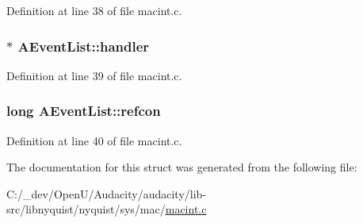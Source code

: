 Definition at line 38 of file macint.\+c.

\subsubsection[{\texorpdfstring{handler}{handler}}]{$\ast$ A\+Event\+List\+::handler}\hypertarget{struct_a_event_list_a227d5e9032200367a7a54898a0ea0eed}{}\label{struct_a_event_list_a227d5e9032200367a7a54898a0ea0eed}


Definition at line 39 of file macint.\+c.

\subsubsection[{\texorpdfstring{refcon}{refcon}}]{\setlength{\rightskip}{0pt plus 5cm}long A\+Event\+List\+::refcon}\hypertarget{struct_a_event_list_ab0bffe731a66d56658a41f5e2fdbfbff}{}\label{struct_a_event_list_ab0bffe731a66d56658a41f5e2fdbfbff}


Definition at line 40 of file macint.\+c.



The documentation for this struct was generated from the following file\+:\begin{DoxyCompactItemize}
\item 
C\+:/\+\_\+dev/\+Open\+U/\+Audacity/audacity/lib-\/src/libnyquist/nyquist/sys/mac/\hyperlink{macint_8c}{macint.\+c}\end{DoxyCompactItemize}
